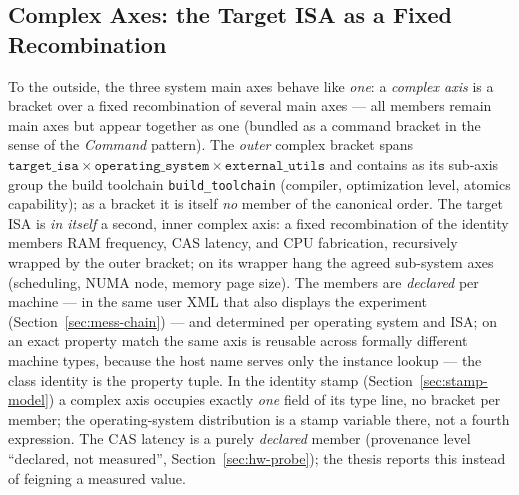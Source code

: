 \begin{nurlang}
\subsection{Complex Axes: the Target ISA as a Fixed Recombination}\label{sec:complex-axis}
To the outside, the three system main axes behave like \emph{one}: a \emph{complex axis}
is a bracket over a fixed recombination of several main axes --- all members remain
main axes but appear together as one (bundled as a command bracket in the sense of the
\emph{Command} pattern). The \emph{outer} complex bracket spans
$\texttt{target\_isa} \times \texttt{operating\_system} \times \texttt{external\_utils}$ and contains
as its sub-axis group the build toolchain \texttt{build\_toolchain} (compiler, optimization level,
atomics capability); as a bracket it is itself \emph{no} member of the
canonical order. The target ISA is \emph{in itself} a second, inner complex axis: a fixed
recombination of the identity members RAM frequency, CAS latency, and CPU fabrication, recursively wrapped by the
outer bracket; on its wrapper hang the agreed sub-system axes (scheduling,
NUMA node, memory page size). The members are \emph{declared} per machine --- in
the same user XML that also displays the experiment (Section~\ref{sec:mess-chain}) --- and determined per
operating system and ISA\@; on an exact property match the same axis is reusable across formally
different machine types, because the host name serves only the instance lookup ---
the class identity is the property tuple. In the identity stamp
(Section~\ref{sec:stamp-model}) a complex axis occupies exactly \emph{one} field of its type line,
no bracket per member; the operating-system distribution is a stamp variable there, not a
fourth expression. The CAS latency is a purely \emph{declared} member
(provenance level \enquote{declared, not measured}, Section~\ref{sec:hw-probe}); the thesis
reports this instead of feigning a measured value.

\end{nurlang}
